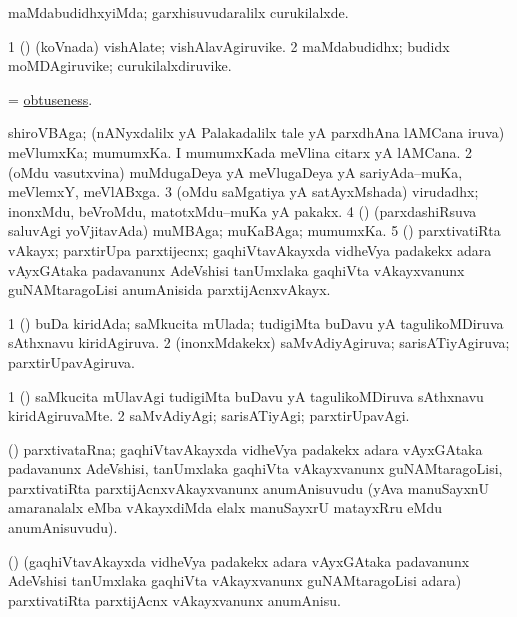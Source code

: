 \bentry
{}
\gl{\kirxvi}
\bmng
maMdabudidhxyiMda; garxhisuvudaralilx curukilalxde. 
\emng
\eentry

\bentry
{}
\gl{\nA}
\bmng
\bnum
\num{1} (\ga) (koVnada) vishAlate; vishAlavAgiruvike. 
\num{2} maMdabudidhx; budidx moMDAgiruvike; curukilalxdiruvike. 
\enum
\emng
\eentry

\bentry
{}
\gl{\nA}
\bmng
= \hyperlink{obtuseness}{obtuseness}. 
\emng
\eentry

\bentry
{}
\gl{\nA}
\bmng
\bnum
{} 
\banum
{} shiroVBAga; (nANyxdalilx yA Palakadalilx tale yA parxdhAna lAMCana iruva) meVlumxKa; mumumxKa. 
 I mumumxKada meVlina citarx yA lAMCana. 
\eanum
\numie
\num{2} (oMdu vasutxvina) muMdugaDeya yA meVlugaDeya yA sariyAda--muKa, meVlemxY, meVlABxga. 
\num{3} (oMdu saMgatiya yA satAyxMshada) virudadhx; inonxMdu, beVroMdu, matotxMdu--muKa yA pakakx. 
\num{4} (\rUpa) (parxdashiRsuva saluvAgi yoVjitavAda) muMBAga; muKaBAga; mumumxKa. 
\num{5} (\takaR) parxtivatiRta vAkayx; parxtirUpa parxtijecnx; gaqhiVtavAkayxda vidheVya padakekx adara vAyxGAtaka padavanunx AdeVshisi tanUmxlaka gaqhiVta vAkayxvanunx guNAMtaragoLisi anumAnisida parxtijAcnxvAkayx. 
\enum
\emng
\eentry

\bentry
{}
\gl{\gu}
\bmng
\bnum
\num{1} (\jiVvi) buDa kiridAda; saMkucita mUlada; tudigiMta buDavu yA tagulikoMDiruva sAthxnavu kiridAgiruva. 
\num{2} (inonxMdakekx) saMvAdiyAgiruva; sarisATiyAgiruva; parxtirUpavAgiruva. 
\enum
\emng
\eentry

\bentry
{}
\gl{\kirxvi}
\bmng
\bnum
\num{1} (\jiVvi) saMkucita mUlavAgi tudigiMta buDavu yA tagulikoMDiruva sAthxnavu kiridAgiruvaMte. 
\num{2} saMvAdiyAgi; sarisATiyAgi; parxtirUpavAgi. 
\enum
\emng
\eentry

\bentry
{}
\gl{\nA}
\bmng
(\takaR) parxtivataRna; gaqhiVtavAkayxda vidheVya padakekx adara vAyxGAtaka padavanunx AdeVshisi, tanUmxlaka gaqhiVta vAkayxvanunx guNAMtaragoLisi, parxtivatiRta parxtijAcnxvAkayxvanunx anumAnisuvudu (yAva manuSayxnU amaranalalx eMba vAkayxdiMda elalx manuSayxrU matayxRru eMdu anumAnisuvudu). 
\emng
\eentry

\bentry
{}
\gl{\sakirx}
\bmng
(\takaR) (gaqhiVtavAkayxda vidheVya padakekx adara vAyxGAtaka padavanunx AdeVshisi tanUmxlaka gaqhiVta vAkayxvanunx guNAMtaragoLisi adara) parxtivatiRta parxtijAcnx vAkayxvanunx anumAnisu. 
\emng
\eentry

